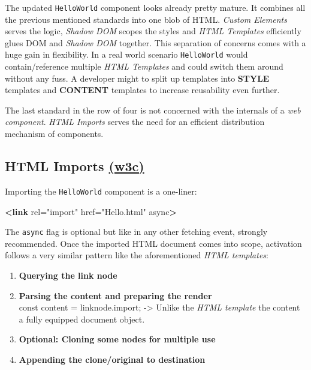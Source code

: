 \documentclass[]{article}
\newenvironment{Shaded}{}{}
\newcommand{\KeywordTok}[1]{\textcolor[rgb]{0.00,0.44,0.13}{\textbf{{#1}}}}
\newcommand{\StringTok}[1]{\textcolor[rgb]{0.25,0.44,0.63}{{#1}}}
\newcommand{\OtherTok}[1]{\textcolor[rgb]{0.00,0.44,0.13}{{#1}}}
\begin{document}
The updated \texttt{HelloWorld} component looks already pretty mature.
It combines all the previous mentioned standards into one blob of HTML.
\emph{Custom Elements} serves the logic, \emph{Shadow DOM} scopes the
styles and \emph{HTML Templates} efficiently glues DOM and \emph{Shadow
DOM} together. This separation of concerns comes with a huge gain in
flexibility. In a real world scenario \texttt{HelloWorld} would
contain/reference multiple \emph{HTML Templates} and could switch them
around without any fuss. A developer might to split up templates into
\textbf{STYLE} templates and \textbf{CONTENT} templates to increase
reusability even further.

The last standard in the row of four is not concerned with the internals
of a \emph{web component}. \emph{HTML Imports} serves the need for an
efficient distribution mechanism of components.

\subsection{\texorpdfstring{HTML Imports
\href{https://www.w3.org/TR/html-imports/}{(w3c)}}{HTML Imports (w3c)}}\label{html-imports-w3c}

Importing the \texttt{HelloWorld} component is a one-liner:

\begin{Shaded}
\begin{Highlighting}[]
\KeywordTok{<link}\OtherTok{ rel=}\StringTok{"import"}\OtherTok{ href=}\StringTok{"Hello.html"}\OtherTok{ async}\KeywordTok{>}
\end{Highlighting}
\end{Shaded}

The \texttt{async} flag is optional but like in any other fetching
event, strongly recommended. Once the imported HTML document comes into
scope, activation follows a very similar pattern like the aforementioned
\emph{HTML templates}:

\begin{enumerate}
\def\labelenumi{\arabic{enumi}.}
\item
  \textbf{Querying the link node}
\item
  \textbf{Parsing the content and preparing the render}\\
  const content = linknode.import; -\textgreater{} Unlike the \emph{HTML
  template} the content a fully equipped document object.
\item
  \textbf{Optional: Cloning some nodes for multiple use}
\item
  \textbf{Appending the clone/original to destination}
\end{enumerate}
\end{document}
